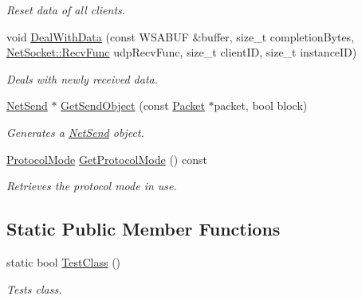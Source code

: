 \begin{DoxyCompactItemize}
\begin{DoxyCompactList}\small\item\em Reset data of all clients. \item\end{DoxyCompactList}\item 
void \hyperlink{class_net_mode_udp_catch_all_no_a9a7e511a9c813ae4889ee4afa1e840ba}{DealWithData} (const WSABUF \&buffer, size\_\-t completionBytes, \hyperlink{class_net_socket_a52b5f4de8d0a47fd8620f542b21c076c}{NetSocket::RecvFunc} udpRecvFunc, size\_\-t clientID, size\_\-t instanceID)
\begin{DoxyCompactList}\small\item\em Deals with newly received data. \item\end{DoxyCompactList}\item 
\hyperlink{class_net_send}{NetSend} $\ast$ \hyperlink{class_net_mode_udp_catch_all_no_a32447c9f1e407a509e3b0179f50fab5c}{GetSendObject} (const \hyperlink{class_packet}{Packet} $\ast$packet, bool block)
\begin{DoxyCompactList}\small\item\em Generates a \hyperlink{class_net_send}{NetSend} object. \item\end{DoxyCompactList}\item 
\hyperlink{class_net_mode_a43cfa55ee6a4db66a8d7d6c27f766964}{ProtocolMode} \hyperlink{class_net_mode_udp_catch_all_no_a29a144e8ac3263b8ea2d8efb3ca6d657}{GetProtocolMode} () const 
\begin{DoxyCompactList}\small\item\em Retrieves the protocol mode in use. \item\end{DoxyCompactList}\end{DoxyCompactItemize}
\subsection*{Static Public Member Functions}
\begin{DoxyCompactItemize}
\item 
static bool \hyperlink{class_net_mode_udp_catch_all_no_a479484b12ab0700640a8caaefb13f33f}{TestClass} ()
\begin{DoxyCompactList}\small\item\em Tests class. \item\end{DoxyCompactList}\end{DoxyCompactItemize}
